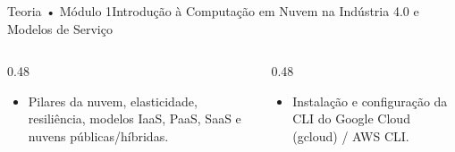 \begin{senaiframe}{Teoria • Módulo 1}{Introdução à Computação em Nuvem na Indústria 4.0 e Modelos de Serviço}
  \begin{columns}[t]
    \begin{column}{0.48\textwidth}
      \begin{tcolorbox}[senaibluecard, title={Fundamentos Teóricos}]
        \begin{itemize}
          \item Pilares da nuvem, elasticidade, resiliência, modelos IaaS, PaaS, SaaS e nuvens públicas/híbridas.
        \end{itemize}
      \end{tcolorbox}
    \end{column}
    \begin{column}{0.48\textwidth}
      \begin{tcolorbox}[senaigreencard, title={Prática \& Laboratório}]
        \begin{itemize}
          \item Instalação e configuração da CLI do Google Cloud (gcloud) / AWS CLI.
        \end{itemize}
      \end{tcolorbox}
    \end{column}
  \end{columns}
\end{senaiframe}
